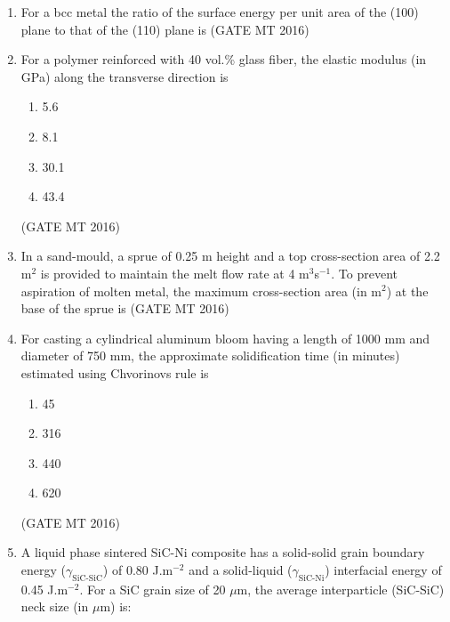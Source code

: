 \documentclass[journal, 11pt, onecolumn]{IEEEtran}
\theoremstyle{remark}
\begin{document}
\begin{enumerate}
\item For a bcc metal the ratio of the surface energy per unit area of the (100) plane to that of the (110) plane is 
\hfill(GATE MT 2016)

\item For a polymer reinforced with 40 vol.\% glass fiber, the elastic modulus (in GPa) along the transverse direction is  

\begin{multicols}{4}
\begin{enumerate}
\item 5.6  
\item 8.1  
\item 30.1  
\item 43.4  
\end{enumerate}
\end{multicols}

\noindent [E$_{\text{glass fiber}}$ = 70 GPa; E$_{\text{polymer}}$ = 3.5 GPa]
\hfill(GATE MT 2016)

\item In a sand-mould, a sprue of 0.25 m height and a top cross-section area of 2.2 m$^{2}$ is provided to maintain the melt flow rate at 4 m$^{3}$s$^{-1}$. To prevent aspiration of molten metal, the maximum cross-section area (in m$^{2}$) at the base of the sprue is 
\hfill(GATE MT 2016)

\item For casting a cylindrical aluminum bloom having a length of 1000 mm and diameter of 750 mm, the approximate solidification time (in minutes) estimated using Chvorinov\textquotesingle s rule is

\begin{multicols}{4}
\begin{enumerate}
\item 45  
\item 316  
\item 440  
\item 620  
\end{enumerate}
\end{multicols}

\hfill(GATE MT 2016)

\item A liquid phase sintered SiC-Ni composite has a solid-solid grain boundary energy ($\gamma_{\text{SiC-SiC}}$) of 0.80 J.m$^{-2}$ and a solid-liquid ($\gamma_{\text{SiC-Ni}}$) interfacial energy of 0.45 J.m$^{-2}$. For a SiC grain size of 20 $\mu$m, the average interparticle (SiC-SiC) neck size (in $\mu$m) is:


\end{enumerate}
\end{document}
